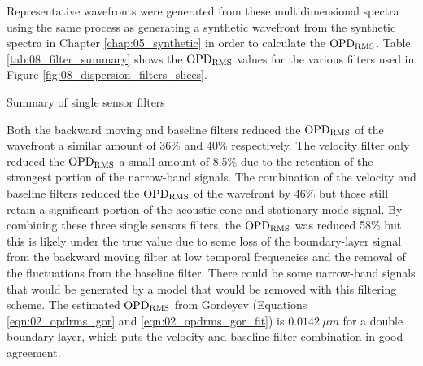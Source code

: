 Representative wavefronts were generated from these multidimensional spectra using the same process as generating a synthetic wavefront from the synthetic spectra in Chapter \ref{chap:05_synthetic} in order to calculate the $\operatorname{OPD_{RMS}}$.
Table \ref{tab:08_filter_summary} shows the $\operatorname{OPD_{RMS}}$ values for the various filters used in Figure \ref{fig:08_dispersion_filters_slices}.
\begin{table}
  \centering
  \caption{Summary of single sensor filters}
  
  \label{tab:08_filter_summary}
\end{table}
Both the backward moving and baseline filters reduced the $\operatorname{OPD_{RMS}}$ of the wavefront a similar amount of 36\% and 40\% respectively.
The velocity filter only reduced the $\operatorname{OPD_{RMS}}$ a small amount of 8.5\% due to the retention of the strongest portion of the narrow-band signals.
The combination of the velocity and baseline filters reduced the $\operatorname{OPD_{RMS}}$ of the wavefront by 46\% but those still retain a significant portion of the acoustic cone and stationary mode signal.
By combining these three single sensors filters, the $\operatorname{OPD_{RMS}}$ was reduced 58\% but this is likely under the true value due to some loss of the boundary-layer signal from the backward moving filter at low temporal frequencies and the removal of the fluctuations from the baseline filter.
There could be some narrow-band signals that would be generated by a model that would be removed with this filtering scheme.
The estimated $\operatorname{OPD_{RMS}}$ from Gordeyev \cite{Gordeyev-2014-jcJndkHM} (Equations \ref{eqn:02_opdrms_gor} and \ref{eqn:02_opdrms_gor_fit}) is $0.0142\ \mu m$ for a double boundary layer, which puts the velocity and baseline filter combination in good agreement.

